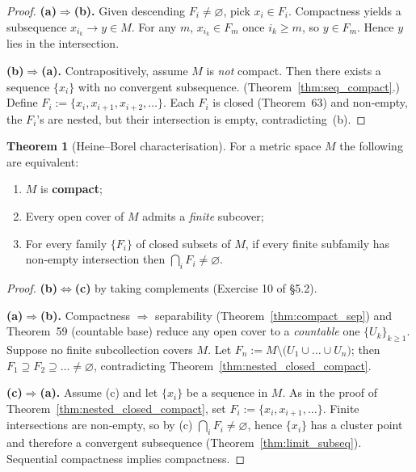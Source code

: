 \documentclass[12pt]{article}
\theoremstyle{definition} %
\newtheorem{theorem}{Theorem}
\theoremstyle{plain} %
\begin{document}
\begin{proof}
  \textbf{(a)$\!\Rightarrow\!$(b).}\;
  Given descending $F_i\ne\varnothing$, pick $x_i\in F_i$.
  Compactness yields a subsequence $x_{i_k}\to y\in M$.
  For any $m$, $x_{i_k}\in F_m$ once $i_k\ge m$, so $y\in F_m$.  
  Hence $y$ lies in the intersection.

  \medskip
  \textbf{(b)$\!\Rightarrow\!$(a).}\;
  Contrapositively, assume $M$ is \emph{not} compact.
  Then there exists a sequence $\{x_i\}$ with no convergent subsequence.
  (Theorem \ref{thm:seq_compact}.)
  Define
  \(
      F_i:=\{x_i,x_{i+1},x_{i+2},\dots\}.
  \)
  Each $F_i$ is closed (Theorem 63) and non‑empty,
  the $F_i$’s are nested, but their intersection is empty,
  contradicting (b).
\end{proof}

\begin{theorem}[Heine–Borel characterisation]\label{thm:HB_metric}
  For a metric space $M$ the following are equivalent:
  \begin{enumerate}[label=\textup{(\alph*)}]
      \item $M$ is \textbf{compact};
      \item Every open cover of $M$ admits a \emph{finite} subcover;
      \item For every family $\{F_i\}$ of closed subsets of $M$,
            if every finite subfamily has non‑empty intersection then
            $\displaystyle\bigcap_i F_i\ne\varnothing$.
  \end{enumerate}
\end{theorem}

\begin{proof}
  \textbf{(b)$\Leftrightarrow$(c)} by taking complements (Exercise 10
  of §5.2).

  \medskip
  \textbf{(a)$\!\Rightarrow\!$(b).}\;
  Compactness $\Rightarrow$ separability (Theorem \ref{thm:compact_sep})
  and Theorem 59 (countable base) reduce any open cover to a
  \emph{countable} one $\{U_k\}_{k\ge1}$.
  Suppose no finite subcollection covers $M$.
  Let $F_n:=M\setminus\bigl(U_1\cup\dots\cup U_n\bigr)$;
  then $F_1\supseteq F_2\supseteq\dots\ne\varnothing$,
  contradicting Theorem \ref{thm:nested_closed_compact}.

  \medskip
  \textbf{(c)$\!\Rightarrow\!$(a).}\;
  Assume (c) and let $\{x_i\}$ be a sequence in $M$.
  As in the proof of Theorem \ref{thm:nested_closed_compact},
  set
  \(
      F_i:=\{x_i,x_{i+1},\dots\}.
  \)
  Finite intersections are non‑empty, so by (c)
  $\bigcap_i F_i\ne\varnothing$,
  hence $\{x_i\}$ has a cluster point and therefore a convergent
  subsequence (Theorem \ref{thm:limit_subseq}).
  Sequential compactness implies compactness.
\end{proof}
\end{document}
